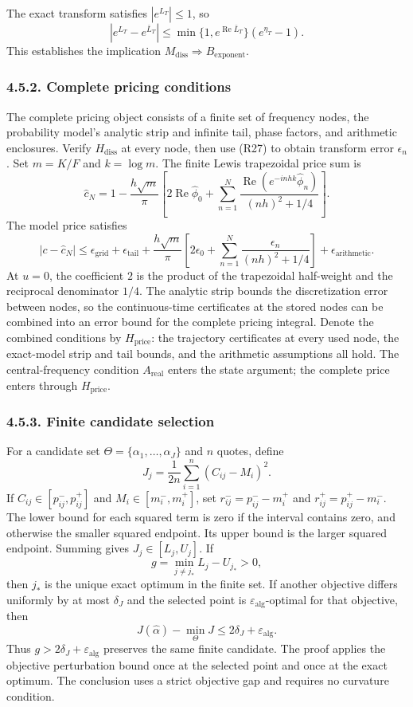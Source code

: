 \documentclass[a4paper,11pt]{article}
\begin{document}
The exact transform satisfies \(|e^{L_T}|\le1\), so
\[
|e^{L_T}-e^{\bar L_T}|
\le\min\{1,e^{\operatorname{Re}\bar L_T}\}(e^{\eta_T}-1).
\tag{R27}
\]
This establishes the implication \(M_{\mathrm{diss}}\Rightarrow B_{\mathrm{exponent}}\).

\subsubsection*{4.5.2. Complete pricing conditions}

The complete pricing object consists of a finite set of frequency nodes, the probability model's analytic strip and infinite tail, phase factors, and arithmetic enclosures. Verify \(H_{\mathrm{diss}}\) at every node, then use (R27) to obtain transform error \(\epsilon_n\). Set \(m=K/F\) and \(k=\log m\). The finite Lewis trapezoidal price sum is
\[
\widehat c_N=1-\frac{h\sqrt m}{\pi}
\left[2\operatorname{Re}\widehat\phi_0+
\sum_{n=1}^N\frac{\operatorname{Re}(e^{-inhk}\widehat\phi_n)}{(nh)^2+1/4}\right].
\tag{R28}
\]
The model price satisfies
\[
|c-\widehat c_N|\le\epsilon_{\mathrm{grid}}+\epsilon_{\mathrm{tail}}
+\frac{h\sqrt m}{\pi}\left[2\epsilon_0+
\sum_{n=1}^N\frac{\epsilon_n}{(nh)^2+1/4}\right]
+\epsilon_{\mathrm{arithmetic}}.
\tag{R29}
\]
At \(u=0\), the coefficient \(2\) is the product of the trapezoidal half-weight and the reciprocal denominator \(1/4\). The analytic strip bounds the discretization error between nodes, so the continuous-time certificates at the stored nodes can be combined into an error bound for the complete pricing integral. Denote the combined conditions by \(H_{\mathrm{price}}\): the trajectory certificates at every used node, the exact-model strip and tail bounds, and the arithmetic assumptions all hold. The central-frequency condition \(A_{\mathrm{real}}\) enters the state argument; the complete price enters through \(H_{\mathrm{price}}\).

\subsubsection*{4.5.3. Finite candidate selection}

For a candidate set \(\Theta=\{\alpha_1,\ldots,\alpha_J\}\) and \(n\) quotes, define
\[
J_j=\frac1{2n}\sum_{i=1}^n(C_{ij}-M_i)^2.
\]
If \(C_{ij}\in[p^-_{ij},p^+_{ij}]\) and \(M_i\in[m_i^-,m_i^+]\), set \(r^-_{ij}=p^-_{ij}-m_i^+\) and \(r^+_{ij}=p^+_{ij}-m_i^-\). The lower bound for each squared term is zero if the interval contains zero, and otherwise the smaller squared endpoint. Its upper bound is the larger squared endpoint. Summing gives \(J_j\in[L_j,U_j]\). If
\[
g=\min_{j\ne j_*}L_j-U_{j_*}>0,
\tag{R30}
\]
then \(j_*\) is the unique exact optimum in the finite set. If another objective differs uniformly by at most \(\delta_J\) and the selected point is \(\varepsilon_{\mathrm{alg}}\)-optimal for that objective, then
\[
J(\widehat\alpha)-\min_\Theta J\le2\delta_J+\varepsilon_{\mathrm{alg}}.
\tag{R31}
\]
Thus \(g>2\delta_J+\varepsilon_{\mathrm{alg}}\) preserves the same finite candidate. The proof applies the objective perturbation bound once at the selected point and once at the exact optimum. The conclusion uses a strict objective gap and requires no curvature condition.
\end{document}
